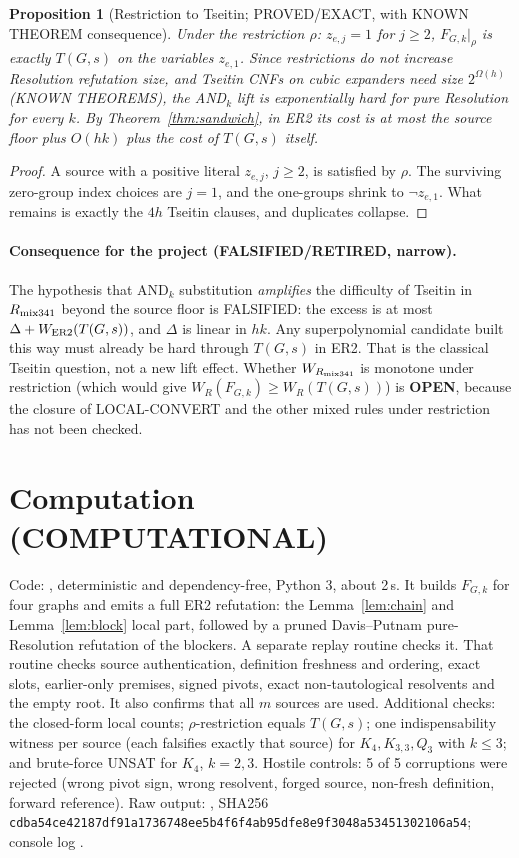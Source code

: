 \documentclass[11pt]{article}
\newtheorem{proposition}[theorem]{Proposition}
\begin{document}
\begin{proposition}[Restriction to Tseitin; PROVED/EXACT, with KNOWN THEOREM consequence]
Under the restriction $\rho$: $z_{e,j}=1$ for $j\ge2$, $F_{G,k}|_\rho$ is exactly $T(G,s)$ on the variables $z_{e,1}$. Since restrictions do not increase Resolution refutation size, and Tseitin CNFs on cubic expanders need size $2^{\Omega(h)}$ \cite{Urq,BSW} (KNOWN THEOREMS), the AND$_k$ lift is exponentially hard for pure Resolution for every $k$. By Theorem~\ref{thm:sandwich}, in ER2 its cost is at most the source floor plus $O(hk)$ plus the cost of $T(G,s)$ itself.
\end{proposition}
\begin{proof}
A source with a positive literal $z_{e,j}$, $j\ge2$, is satisfied by $\rho$. The surviving zero-group index choices are $j=1$, and the one-groups shrink to $\neg z_{e,1}$. What remains is exactly the $4h$ Tseitin clauses, and duplicates collapse.
\end{proof}

\paragraph{Consequence for the project (FALSIFIED/RETIRED, narrow).} The hypothesis that AND$_k$ substitution \emph{amplifies} the difficulty of Tseitin in $R_{\rm mix341}$ beyond the source floor is FALSIFIED: the excess is at most $\Delta+W_{\rm ER2}(T(G,s))$, and $\Delta$ is linear in $hk$. Any superpolynomial candidate built this way must already be hard through $T(G,s)$ in ER2. That is the classical Tseitin question, not a new lift effect. Whether $W_{R_{\rm mix341}}$ is monotone under restriction (which would give $W_R(F_{G,k})\ge W_R(T(G,s))$) is \textbf{OPEN}, because the closure of LOCAL-CONVERT and the other mixed rules under restriction has not been checked.

\section{Computation (COMPUTATIONAL)}
Code: , deterministic and dependency-free, Python 3, about 2\,s. It builds $F_{G,k}$ for four graphs and emits a full ER2 refutation: the Lemma~\ref{lem:chain} and Lemma~\ref{lem:block} local part, followed by a pruned Davis--Putnam pure-Resolution refutation of the blockers. A separate replay routine checks it. That routine checks source authentication, definition freshness and ordering, exact slots, earlier-only premises, signed pivots, exact non-tautological resolvents and the empty root. It also confirms that all $m$ sources are used. Additional checks: the closed-form local counts; $\rho$-restriction equals $T(G,s)$; one indispensability witness per source (each falsifies exactly that source) for $K_4,K_{3,3},Q_3$ with $k\le3$; and brute-force UNSAT for $K_4$, $k=2,3$. Hostile controls: 5 of 5 corruptions were rejected (wrong pivot sign, wrong resolvent, forged source, non-fresh definition, forward reference). Raw output: , SHA256 \texttt{cdba54ce42187df91a1736748ee5b4f6f4ab95dfe8e9f3048a53451302106a54}; console log .
\end{document}
